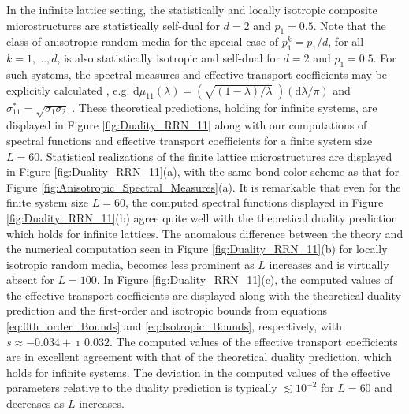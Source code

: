 \documentclass{cmslatex}
\renewcommand{\d}{\text{d}}
\begin{document}
In the infinite lattice setting, the statistically and locally
isotropic composite microstructures are statistically self-dual
\cite{MILTON:2002:TC} for $d=2$ and $p_1=0.5$. Note that the class of
anisotropic random media for the special case of $p_1^k=p_1/d$, for all
$k=1,\ldots,d$, is also statistically isotropic and self-dual for  $d=2$ and
$p_1=0.5$. For such systems, the spectral measures and 
effective transport coefficients may be explicitly calculated
\cite{MILTON:2002:TC},
e.g. $\d\mu_{11}(\lambda)=(\sqrt{(1-\lambda)/\lambda}\;)(\d\lambda/\pi)$ and  
$\sigma^*_{11}=\sqrt{\sigma_1\sigma_2}\;$. These theoretical predictions, holding for
infinite systems, are displayed in Figure \ref{fig:Duality_RRN_11}
along with our computations of spectral functions and effective
transport coefficients for a finite system size $L=60$. Statistical 
realizations of the finite lattice microstructures 
are displayed in Figure \ref{fig:Duality_RRN_11}(a), with the same
bond color scheme as that for Figure
\ref{fig:Anisotropic_Spectral_Measures}(a). It is remarkable that even
for the finite system size $L=60$, the computed spectral functions
displayed in Figure \ref{fig:Duality_RRN_11}(b) agree quite well with
the theoretical duality prediction which holds for infinite lattices. The  
anomalous difference between the theory and the numerical computation
seen in Figure \ref{fig:Duality_RRN_11}(b) for locally isotropic
random media, becomes less prominent as $L$ increases and is virtually
absent for $L=100$. In Figure \ref{fig:Duality_RRN_11}(c), 
the computed values of the effective 
transport coefficients are displayed along with the
theoretical duality prediction and the first-order
and isotropic bounds from equations \eqref{eq:0th_order_Bounds} and
\eqref{eq:Isotropic_Bounds}, respectively, with
$s\approx-0.034+\imath\,0.032$. The computed values of the effective
transport coefficients are in excellent agreement with that of the
theoretical duality prediction, which holds for infinite systems. The
deviation in the computed values of the effective parameters relative
to the duality prediction is typically $\lesssim10^{-2}$ for $L=60$
and decreases as $L$ increases.  
\end{document}
